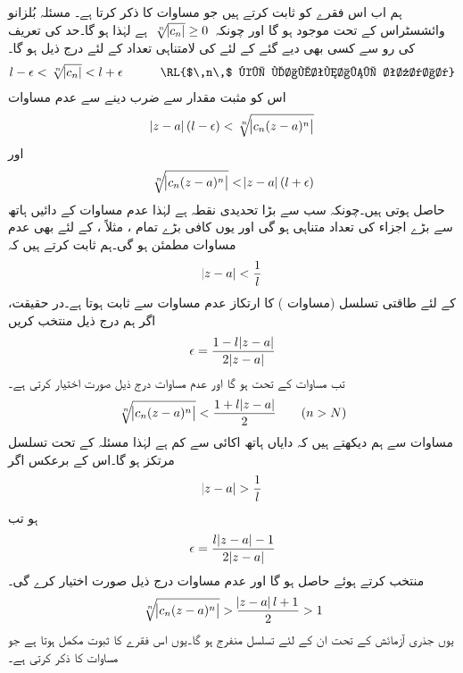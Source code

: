 ہم اب اس فقرے کو ثابت کرتے ہیں جو مساوات  کا ذکر کرتا ہے۔ مسئلہ بُلزانو وائشسٹراس  کے تحت  موجود ہو گا اور چونکہ
$\,\sqrt[\leftroot{-2}n]{\abs{c_n}}\ge 0\,$
ہے لہٰذا  ہو گا۔حد کی تعریف کی رو سے  کسی بھی دیے گئے  کے لئے  کی لامتناہی تعداد کے لئے درج ذیل ہو گا۔
\begin{align*}
l-\epsilon<\sqrt[\leftroot{-2}n]{\abs{c_n}}<l+\epsilon\quad \quad \quad \text{\RL{$\,n\,$ کی لامتناہی تعداد}}
\end{align*}
اس کو مثبت مقدار  سے ضرب دینے سے عدم مساوات
\begin{align}\label{مساوات_ٹیلر_رداس_ارتکاز_پ}
\abs{z-a}(l-\epsilon)<\sqrt[\leftroot{-2}n]{\abs{c_n(z-a)^n}}
\end{align}
اور
\begin{align}\label{مساوات_ٹیلر_رداس_ارتکاز_ت}
\sqrt[\leftroot{-2}n]{\abs{c_n(z-a)^n}}<\abs{z-a}(l+\epsilon)
\end{align}
حاصل ہوتی ہیں۔چونکہ  سب سے بڑا تحدیدی نقطہ ہے لہٰذا  عدم مساوات  کے دائیں ہاتھ سے بڑے اجزاء کی تعداد متناہی ہو گی اور یوں 
 کافی بڑے تمام ، مثلاً ، کے لئے بھی عدم مساوات  مطمئن ہو گی۔ہم ثابت کرتے ہیں کہ
\begin{align}\label{مساوات_ٹیلر_رداس_ارتکاز_ٹ}
\abs{z-a}<\frac{1}{l}
\end{align}
کے لئے طاقتی تسلسل (مساوات ) کا ارتکاز  عدم مساوات  سے ثابت ہوتا ہے۔در حقیقت، اگر ہم درج ذیل منتخب کریں
\begin{align*}
\epsilon=\frac{1-l\abs{z-a}}{2\abs{z-a}}
\end{align*}
تب مساوات  کے تحت  ہو گا اور عدم مساوات  درج ذیل صورت اختیار کرتی ہے۔
\begin{align*}
\sqrt[\leftroot{-2}n]{\abs{c_n(z-a)^n}}<\frac{1+l\abs{z-a}}{2}\quad \quad (n>N)
\end{align*}
مساوات  سے ہم دیکھتے ہیں کہ دایاں ہاتھ اکائی سے کم ہے لہٰذا مسئلہ  کے تحت تسلسل مرتکز ہو گا۔اس کے برعکس اگر 
\begin{align*}
\abs{z-a}>\frac{1}{l}
\end{align*}
ہو تب
\begin{align*}
\epsilon=\frac{l\abs{z-a}-1}{2\abs{z-a}}
\end{align*}
منتخب کرتے ہوئے  حاصل ہو گا اور  عدم مساوات  درج ذیل صورت اختیار کرے گی۔
\begin{align*}
\sqrt[\leftroot{-2}n]{\abs{c_n(z-a)^n}}>\frac{\abs{z-a}l+1}{2}>1
\end{align*}
یوں جذری آزمائش کے تحت ان  کے لئے تسلسل منفرج ہو گا۔یوں اس فقرے کا ثبوت مکمل ہوتا ہے  جو مساوات  کا ذکر کرتی ہے۔

